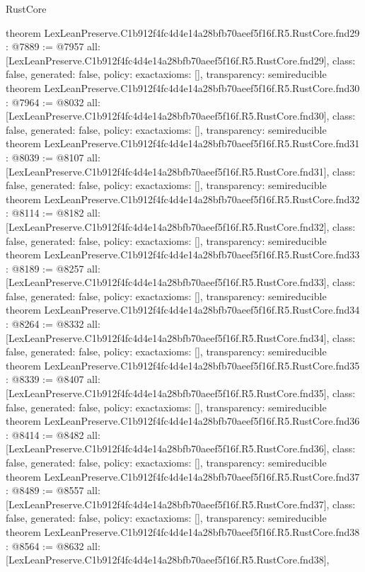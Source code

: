 \begin{lexlean}{RustCore}
\begin{coremodule}
{}
theorem LexLeanPreserve.C1b912f4fc4d4e14a28bfb70aeef5f16f.R5.RustCore.fnd29 : @7889 := @7957 {
  all: [LexLeanPreserve.C1b912f4fc4d4e14a28bfb70aeef5f16f.R5.RustCore.fnd29],
  class: false,
  generated: false,
  policy: exact{axioms: []},
  transparency: semireducible
}
theorem LexLeanPreserve.C1b912f4fc4d4e14a28bfb70aeef5f16f.R5.RustCore.fnd30 : @7964 := @8032 {
  all: [LexLeanPreserve.C1b912f4fc4d4e14a28bfb70aeef5f16f.R5.RustCore.fnd30],
  class: false,
  generated: false,
  policy: exact{axioms: []},
  transparency: semireducible
}
theorem LexLeanPreserve.C1b912f4fc4d4e14a28bfb70aeef5f16f.R5.RustCore.fnd31 : @8039 := @8107 {
  all: [LexLeanPreserve.C1b912f4fc4d4e14a28bfb70aeef5f16f.R5.RustCore.fnd31],
  class: false,
  generated: false,
  policy: exact{axioms: []},
  transparency: semireducible
}
theorem LexLeanPreserve.C1b912f4fc4d4e14a28bfb70aeef5f16f.R5.RustCore.fnd32 : @8114 := @8182 {
  all: [LexLeanPreserve.C1b912f4fc4d4e14a28bfb70aeef5f16f.R5.RustCore.fnd32],
  class: false,
  generated: false,
  policy: exact{axioms: []},
  transparency: semireducible
}
theorem LexLeanPreserve.C1b912f4fc4d4e14a28bfb70aeef5f16f.R5.RustCore.fnd33 : @8189 := @8257 {
  all: [LexLeanPreserve.C1b912f4fc4d4e14a28bfb70aeef5f16f.R5.RustCore.fnd33],
  class: false,
  generated: false,
  policy: exact{axioms: []},
  transparency: semireducible
}
theorem LexLeanPreserve.C1b912f4fc4d4e14a28bfb70aeef5f16f.R5.RustCore.fnd34 : @8264 := @8332 {
  all: [LexLeanPreserve.C1b912f4fc4d4e14a28bfb70aeef5f16f.R5.RustCore.fnd34],
  class: false,
  generated: false,
  policy: exact{axioms: []},
  transparency: semireducible
}
theorem LexLeanPreserve.C1b912f4fc4d4e14a28bfb70aeef5f16f.R5.RustCore.fnd35 : @8339 := @8407 {
  all: [LexLeanPreserve.C1b912f4fc4d4e14a28bfb70aeef5f16f.R5.RustCore.fnd35],
  class: false,
  generated: false,
  policy: exact{axioms: []},
  transparency: semireducible
}
theorem LexLeanPreserve.C1b912f4fc4d4e14a28bfb70aeef5f16f.R5.RustCore.fnd36 : @8414 := @8482 {
  all: [LexLeanPreserve.C1b912f4fc4d4e14a28bfb70aeef5f16f.R5.RustCore.fnd36],
  class: false,
  generated: false,
  policy: exact{axioms: []},
  transparency: semireducible
}
theorem LexLeanPreserve.C1b912f4fc4d4e14a28bfb70aeef5f16f.R5.RustCore.fnd37 : @8489 := @8557 {
  all: [LexLeanPreserve.C1b912f4fc4d4e14a28bfb70aeef5f16f.R5.RustCore.fnd37],
  class: false,
  generated: false,
  policy: exact{axioms: []},
  transparency: semireducible
}
theorem LexLeanPreserve.C1b912f4fc4d4e14a28bfb70aeef5f16f.R5.RustCore.fnd38 : @8564 := @8632 {
  all: [LexLeanPreserve.C1b912f4fc4d4e14a28bfb70aeef5f16f.R5.RustCore.fnd38],
}
\end{coremodule}
\end{lexlean}

